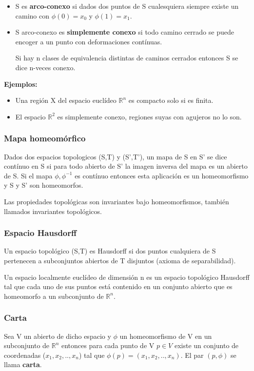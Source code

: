 \documentclass{article}
\begin{document}
\begin{itemize}
\item S es \textbf{arco-conexo} si dados dos puntos de S cualesquiera siempre existe un camino con $\phi (0)=x_0$ y $\phi (1)=x_1$.

\item S arco-conexo es \textbf{simplemente conexo} si todo camino cerrado se puede encoger a un punto con deformaciones contínuas.

Si hay n clases de equivalencia distintas de caminos cerrados entonces S se dice n-veces conexo.
\end{itemize}

\textbf{Ejemplos:}

\begin{itemize}
\item Una región X del espacio euclídeo $\mathds{R}^n$ es compacto solo si es finita.
\item El espacio $\mathds{R}^2$ es simplemente conexo, regiones suyas con agujeros no lo son.
\end{itemize}

\subsubsection{Mapa homeomórfico}

Dados dos espacios topologicos (S,T) y (S',T'), un mapa de S en S' se dice contínuo en S si para todo abierto de S' la imagen inversa del mapa es un abierto de S. Si el mapa $\phi , \phi ^{-1}$ es contínuo entonces esta aplicación es un homeomorfismo y S y S' son homeomorfos.

\smallskip
Las propiedades topológicas son invariantes bajo homeomorfismos, también llamados invariantes topológicos.

\subsubsection{Espacio Hausdorff}

Un espacio topológico (S,T) es Hausdorff si dos puntos cualquiera de S pertenecen a subconjuntos abiertos de T disjuntos (axioma de separabilidad).

Un espacio localmente euclídeo de dimensión n es un espacio topológico Hausdorff tal que cada uno de sus puntos está contenido en un conjunto abierto que es homeomorfo a un subconjunto de $\mathds{R}^n$.


\subsubsection{Carta}
Sea V un abierto de dicho espacio y $\phi$ un homeomorfismo de V en un subconjunto de $\mathds{R}^n$ entonces para cada punto de V $p\in V$ existe un conjunto de coordenadas ($x_1,x_2,..,x_n$) tal que $\phi (p)= (x_1,x_2,..,x_n) $. El par $(p, \phi)$ se llama \textbf{carta}.
\end{document}
